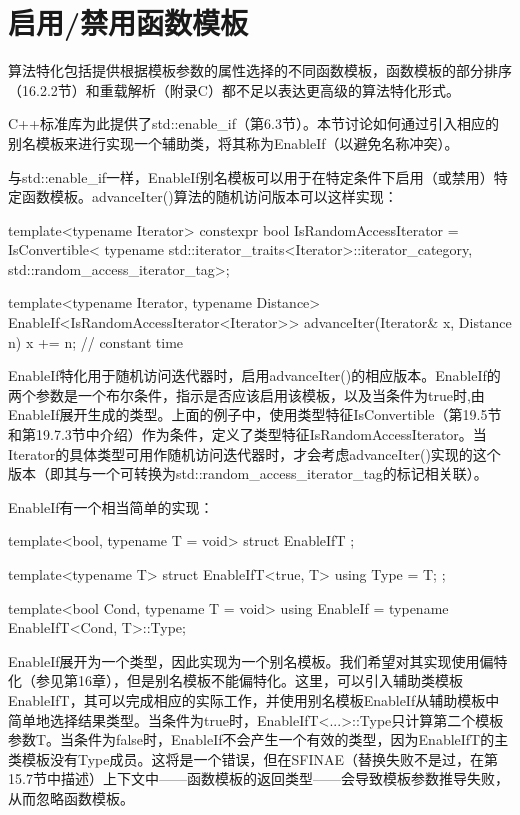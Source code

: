 \section{启用/禁用函数模板}

算法特化包括提供根据模板参数的属性选择的不同函数模板，函数模板的部分排序（16.2.2节）和重载解析（附录C）都不足以表达更高级的算法特化形式。

C++标准库为此提供了std::enable\_if（第6.3节）。本节讨论如何通过引入相应的别名模板来进行实现一个辅助类，将其称为EnableIf（以避免名称冲突）。

与std::enable\_if一样，EnableIf别名模板可以用于在特定条件下启用（或禁用）特定函数模板。advanceIter()算法的随机访问版本可以这样实现：

\begin{cpp}
template<typename Iterator>
constexpr bool IsRandomAccessIterator =
	IsConvertible<
		typename std::iterator_traits<Iterator>::iterator_category,
		std::random_access_iterator_tag>;
		
template<typename Iterator, typename Distance>
EnableIf<IsRandomAccessIterator<Iterator>>
advanceIter(Iterator& x, Distance n) {
	x += n; // constant time
}
\end{cpp}

EnableIf特化用于随机访问迭代器时，启用advanceIter()的相应版本。EnableIf的两个参数是一个布尔条件，指示是否应该启用该模板，以及当条件为true时,由EnableIf展开生成的类型。上面的例子中，使用类型特征IsConvertible（第19.5节和第19.7.3节中介绍）作为条件，定义了类型特征IsRandomAccessIterator。当Iterator的具体类型可用作随机访问迭代器时，才会考虑advanceIter()实现的这个版本（即其与一个可转换为std::random\_access\_iterator\_tag的标记相关联）。

EnableIf有一个相当简单的实现：

\begin{cpp}
template<bool, typename T = void>
struct EnableIfT {};

template<typename T>
struct EnableIfT<true, T> {
	using Type = T;
};

template<bool Cond, typename T = void>
using EnableIf = typename EnableIfT<Cond, T>::Type;
\end{cpp}

EnableIf展开为一个类型，因此实现为一个别名模板。我们希望对其实现使用偏特化（参见第16章），但是别名模板不能偏特化。这里，可以引入辅助类模板EnableIfT，其可以完成相应的实际工作，并使用别名模板EnableIf从辅助模板中简单地选择结果类型。当条件为true时，EnableIfT<...>::Type只计算第二个模板参数T。当条件为false时，EnableIf不会产生一个有效的类型，因为EnableIfT的主类模板没有Type成员。这将是一个错误，但在SFINAE（替换失败不是过，在第15.7节中描述）上下文中——函数模板的返回类型——会导致模板参数推导失败，从而忽略函数模板。

